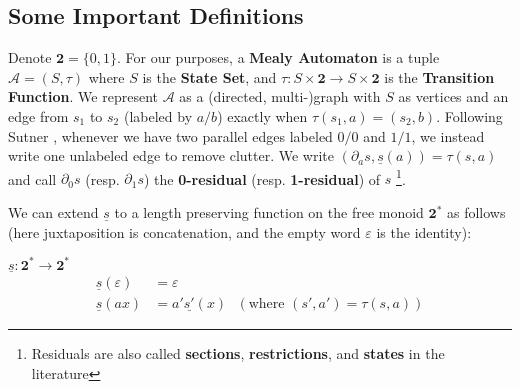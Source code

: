 \documentclass[final]{ws-ijac}
\newcommand{\A}{\mathcal{A}}
\newcommand{\2}{\textbf{2}}
\newcommand{\del}{\partial}
\begin{document}
\subsection{Some Important Definitions}

Denote $\2 = \{0,1\}$. For our purposes, a \textbf{Mealy Automaton} is a 
tuple $\A = (S, \tau)$ where $S$ is the \textbf{State Set}, and 
$\tau : S \times \2 \to S \times \2$ is the \textbf{Transition Function}. 
We represent $\A$ as a (directed, multi-)graph with $S$ as vertices and an
edge from $s_1$ to $s_2$ (labeled by $a/b$) exactly when $\tau(s_1,a) = (s_2,b)$.
Following Sutner \cite{Sutner18:abelian_automata}, whenever we have two 
parallel edges labeled $0/0$ and $1/1$,
we instead write one unlabeled edge to remove clutter.
We write $(\del_a s, \underline{s}(a)) = \tau(s,a)$ and call $\del_0 s$ 
(resp. $\del_1 s$) the \textbf{0-residual} (resp. \textbf{1-residual}) of $s$
\footnote{Residuals are also called \textbf{sections}, \textbf{restrictions},
and \textbf{states} in the literature}.

We can extend $\underline{s}$ to a length preserving function on the 
free monoid $\2^*$ as follows (here juxtaposition is concatenation, 
and the empty word $\varepsilon$ is the identity):

$\underline{s} : \2^* \to \2^*$
\begin{align*}
  \underline{s}(\varepsilon) &= \varepsilon\\
  \underline{s}(ax)       &= a' \underline{s'}(x) 
  ~~~(\text{where } (s', a') = \tau(s,a))
\end{align*}
\end{document}
